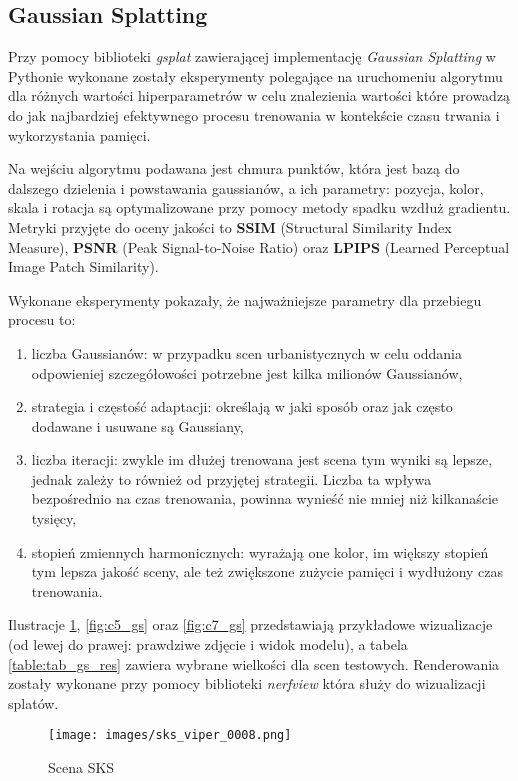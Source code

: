 \subsection{Gaussian Splatting}
Przy pomocy biblioteki \textit{gsplat}\cite{ye2024gsplatopensourcelibrarygaussian} zawierającej implementację \textit{Gaussian Splatting} w Pythonie wykonane zostały eksperymenty polegające na uruchomeniu algorytmu dla różnych wartości hiperparametrów w celu znalezienia wartości które prowadzą do jak najbardziej efektywnego procesu trenowania w kontekście czasu trwania i wykorzystania pamięci. 

Na wejściu algorytmu podawana jest chmura punktów, która jest bazą do dalszego dzielenia i powstawania gaussianów, a ich parametry: pozycja, kolor, skala i rotacja są optymalizowane przy pomocy metody spadku wzdłuż gradientu. Metryki przyjęte do oceny jakości to \textbf{SSIM} (Structural Similarity Index Measure), \textbf{PSNR} (Peak Signal-to-Noise Ratio) oraz \textbf{LPIPS} (Learned Perceptual Image Patch Similarity).

Wykonane eksperymenty pokazały, że najważniejsze parametry dla przebiegu procesu to: 
\begin{enumerate}
    \item liczba Gaussianów: w przypadku scen urbanistycznych w celu oddania odpowieniej szczegółowości potrzebne jest kilka milionów Gaussianów,
    \item strategia i częstość adaptacji: określają w jaki sposób oraz jak często dodawane i usuwane są Gaussiany, 
    \item liczba iteracji: zwykle im dłużej trenowana jest scena tym wyniki są lepsze, jednak zależy to również od przyjętej strategii. Liczba ta wpływa bezpośrednio na czas trenowania, powinna wynieść nie mniej niż kilkanaście tysięcy,
    \item stopień zmiennych harmonicznych: wyrażają one kolor, im większy stopień tym lepsza jakość sceny, ale też zwiększone zużycie pamięci i wydłużony czas trenowania. 
\end{enumerate}

Ilustracje \ref{fig:sks_gs}, \ref{fig:c5_gs} oraz \ref{fig:c7_gs} przedstawiają przykładowe wizualizacje (od lewej do prawej: prawdziwe zdjęcie i widok modelu), a tabela \ref{table:tab_gs_res} zawiera wybrane wielkości dla scen testowych. Renderowania zostały wykonane przy pomocy biblioteki \textit{nerfview} która służy do wizualizacji splatów.

\begin{figure}[!h]
    \centering
    \texttt{[image: images/sks\_viper\_0008.png]}
    \caption{Scena SKS}
    \label{fig:sks_gs}
\end{figure}

